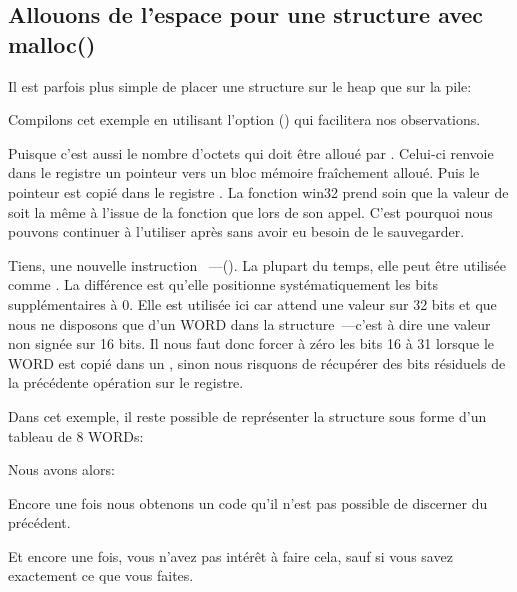 ﻿\subsection{Allouons de l'espace pour une structure avec malloc()}
\label{struct_malloc_example}

Il est parfois plus simple de placer une structure sur le \gls{heap} que sur la pile:



Compilons cet exemple en utilisant l'option (\Ox) qui facilitera nos observations.




Puisque  c'est aussi le nombre d'octets qui doit être alloué par
. Celui-ci renvoie dans le registre \EAX un pointeur vers un bloc mémoire fraîchement
alloué. Puis le pointeur est copié dans le registre \ESI.
La fonction win32  prend soin que la valeur de \ESI soit la même à l'issue de la
fonction que lors de son appel. C'est pourquoi nous pouvons continuer à l'utiliser après sans avoir
eu besoin de le sauvegarder.


Tiens, une nouvelle instruction ~---\MOVZX ().
La plupart du temps, elle peut être utilisée comme \MOVSX. La différence est qu'elle positionne
systématiquement les bits supplémentaires à 0.
Elle est utilisée ici car \printf attend une valeur sur 32 bits et que nous ne disposons que d'un
WORD dans la structure~---c'est à dire une valeur non signée sur 16 bits. Il nous faut donc forcer
à zéro les bits 16 à 31 lorsque le WORD est copié dans un \Tint{}, sinon nous risquons de
récupérer des bits résiduels de la précédente opération sur le registre.

Dans cet exemple, il reste possible de représenter la structure sous forme d'un tableau de 8 WORDs:



Nous avons alors:



Encore une fois nous obtenons un code qu'il n'est pas possible de discerner du précédent.

Et encore une fois, vous n'avez pas intérêt à faire cela, sauf si vous savez exactement ce que vous
faites.

